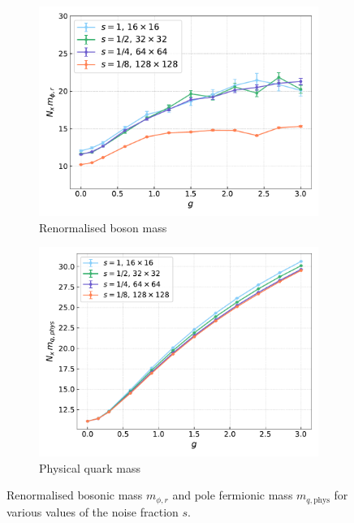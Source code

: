 \begin{figure}[h!]
    \begin{subfigure}{0.47\textwidth}
        \includegraphics[width=\textwidth]{figures/cooling/yukawa_scan/mphir.pdf}
        \caption{Renormalised boson mass}
    \end{subfigure}
    \hfill 
    \begin{subfigure}{0.47\textwidth}
        \includegraphics[width=\textwidth]{figures/cooling/yukawa_scan/mqphys.pdf}
        \caption{Physical quark mass}
    \end{subfigure}
    \caption[Masses in the cooling procedure]{Renormalised bosonic mass $m_{\phi, r}$ and pole fermionic mass $m_{q,\text{phys}}$ for various values of the noise fraction $s$.}
    \label{fig:cooling_yukawa_masses}
\end{figure} \\
